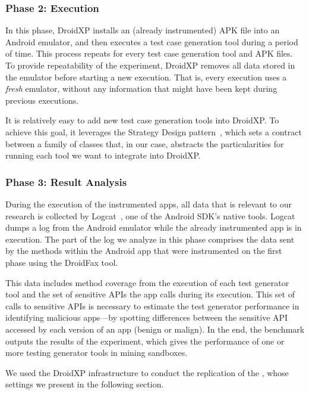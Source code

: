 \subsubsection{Phase 2: Execution}

In this phase, DroidXP installs an (already instrumented) APK file into
an Android emulator, and then executes a test case generation tool
during a period of time. This process repeats for every test case generation
tool and APK files. To provide repeatability of the experiment, DroidXP removes all data stored in the emulator before starting
a new execution. That is, every execution uses a \emph{fresh} emulator,
without any information that might have been kept during
previous executions. 

It is relatively easy to add new test
case generation tools into DroidXP. To achieve this goal, it leverages the Strategy Design
pattern~\cite{patterns-book}, which sets a contract between a family of classes that, in our case, abstracts the particularities
for running each tool we want to integrate into DroidXP.

\subsubsection{Phase 3: Result Analysis}

During the execution of the instrumented apps, all data that is relevant to our
research is collected by Logcat~\cite{Logcat}, one of the Android SDK's native tools. Logcat dumps a log from the Android emulator
while the already instrumented app is in execution. The part of the log we analyze in this phase comprises
the data sent by the methods within the Android app that were instrumented on the first
phase using the DroidFax tool. 

This data includes method coverage from the execution of each test generator tool and the
set of sensitive APIs the app calls during its execution. This set of calls to
sensitive APIs is necessary to estimate the test generator performance in identifying malicious apps---by spotting
differences between the sensitive API accessed by each version of an app (benign or malign).
In the end, the benchmark outputs the results of the experiment, which gives the
performance of one or more testing generator tools in mining sandboxes.

We used the DroidXP infrastructure to conduct the replication of
the \blls, whose settings we present in the following section. 

